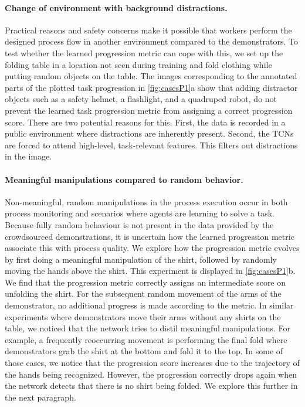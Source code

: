 \documentclass[\home/main.tex]{subfiles}
\begin{document}
\paragraph{Change of environment with background distractions.}
Practical reasons and safety concerns make it possible that workers perform the designed process flow in another environment compared to the demonstrators. To test whether the learned progression metric can cope with this, we set up the folding table in a location not seen during training and fold clothing while putting random objects on the table. The images corresponding to the annotated parts of the plotted task progression in \cref{fig:casesP1}a show that adding distractor objects such as a safety helmet, a flashlight, and a quadruped robot, do not prevent the learned task progression metric from assigning a correct progression score. There are two potential reasons for this. First, the data is recorded in a public environment where distractions are inherently present. Second, the TCNs are forced to attend high-level, task-relevant features. This filters out distractions in the image.

\paragraph{Meaningful manipulations compared to random behavior.}
Non-meaningful, random manipulations in the process execution occur in both process monitoring and scenarios where agents are learning to solve a task. Because fully random behaviour is not present in the data provided by the crowdsourced demonstrations, it is uncertain how the learned progression metric associate this with process quality. We explore how the progression metric evolves by first doing a meaningful manipulation of the shirt, followed by randomly moving the hands above the shirt. This experiment is displayed in \cref{fig:casesP1}b. We find that the progression metric correctly assigns an intermediate score on unfolding the shirt. For the subsequent random movement of the arms of the demonstrator, no additional progress is made according to the metric. In similar experiments where demonstrators move their arms without any shirts on the table, we noticed that the network tries to distil meaningful manipulations. For example, a frequently reoccurring movement is performing the final fold where demonstrators grab the shirt at the bottom and fold it to the top. In some of those cases, we notice that the progression score increases due to the trajectory of the hands being recognized. However, the progression correctly drops again when the network detects that there is no shirt being folded. We explore this further in the next paragraph.
\end{document}
